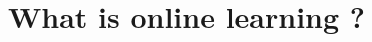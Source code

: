 \documentclass[../main]{subfiles}
\begin{document}
\newcommand*{\CurrentChapter}{01}

\chapter{What is online learning ?}

\end{document}
